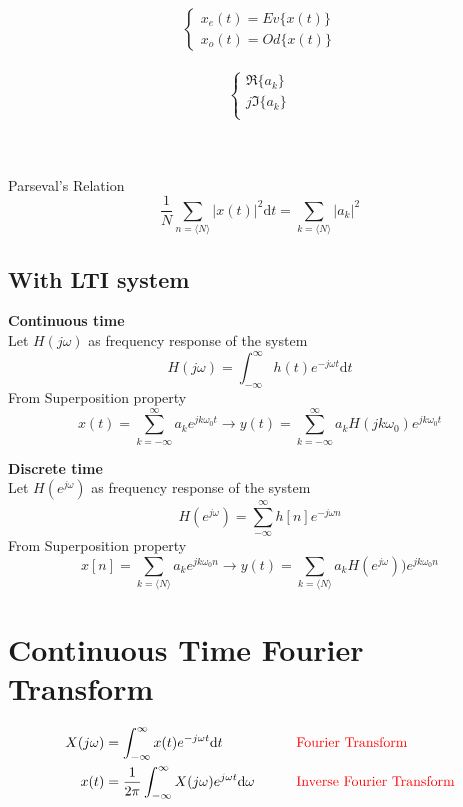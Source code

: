 \documentclass[12pt, a4paper]{article}
\begin{document}
\begin{minipage}[t]{0.3 \textwidth}
\begin{align*}
	\begin{cases}
	  x_e(t) = Ev \{x(t)\} \\
		x_o(t) = Od \{x(t)\}
	\end{cases}
\end{align*}
\end{minipage}
\hfill
\begin{minipage}[t]{0.3 \textwidth}
\begin{align*}
	\begin{cases}
		\Re \{a_k\} \\
	  j\Im \{a_k\}	\\
\end{cases}
\end{align*}
\end{minipage}
\\ \\
Parseval's Relation
$$
\frac{1}{N} \sum_{n = \langle N \rangle} \left|x(t)\right|^2 \text{d}t = \sum_{k=\langle N \rangle} \left|a_k\right|^2
$$
\newpage

\subsection*{With LTI system}
\textbf{Continuous time} \\
Let $H(j\omega)$ as frequency response of the system
$$
H(j\omega) = \int_{-\infty}^{\infty} h(t)e^{-j\omega t}\text{d}t
$$
From Superposition property
$$
x(t) = \sum_{k = -\infty}^{\infty}a_ke^{jk\omega_0t} \longrightarrow y(t) = \sum_{k = -\infty}^{\infty}a_k H(jk\omega_0)e^{jk\omega_0t}
$$

\textbf{Discrete time} \\
Let $H(e^{j\omega})$ as frequency response of the system
$$
H(e^{j\omega}) = \sum_{-\infty}^{\infty} h[n]e^{-j\omega n}
$$
From Superposition property
$$
x[n] = \sum_{k = \langle N \rangle}a_ke^{jk\omega_0n} \longrightarrow y(t) = \sum_{k = \langle N \rangle}a_k H(e^{j\omega}))e^{jk\omega_0n}
$$
\newpage

\section*{Continuous Time Fourier Transform}
\begin{align*}
	X(j\omega) &= \int_{-\infty}^{\infty} x(t)e^{-j\omega t}\text{d}t &&\qquad \color{red} \text {Fourier Transform} \color{black} \\
	x(t) &= \frac{1}{2 \pi} \int_{-\infty}^{\infty}X(j\omega)e^{j\omega t}\text{d}\omega &&\qquad \color{red} \text {Inverse Fourier Transform} \color{black}
\end{align*}
\end{document}
